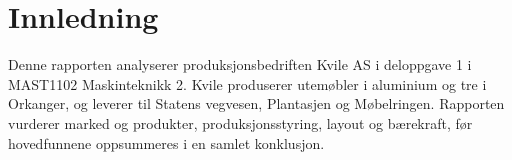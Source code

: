 \section*{Innledning}

Denne rapporten analyserer produksjonsbedriften Kvile AS i deloppgave 1 i MAST1102 Maskinteknikk 2. Kvile produserer utemøbler i aluminium og tre i Orkanger, og leverer til Statens vegvesen, Plantasjen og Møbelringen. Rapporten vurderer marked og produkter, produksjonsstyring, layout og bærekraft, før hovedfunnene oppsummeres i en samlet konklusjon.